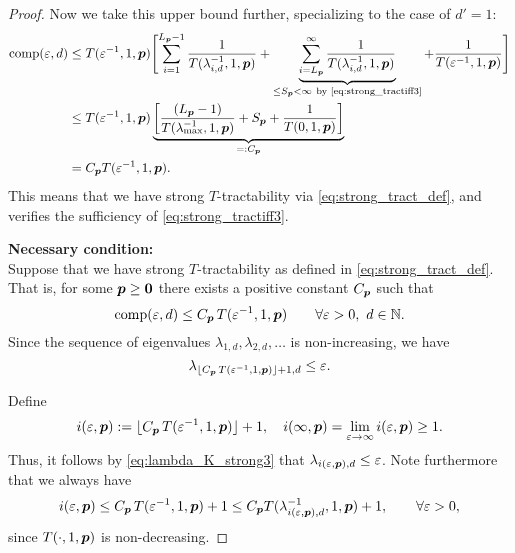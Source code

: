 \documentclass[11pt,a4paper]{article}
\begin{document}
\begin{proof}
Now we take this upper bound further, specializing to the case of $d'=1$:
\begin{align*}
       \operatorname{comp}(\varepsilon,d)
       & \le T(\varepsilon^{-1},1, \boldsymbol{p}) \Biggl [ \sum_{i=1}^{L_{\boldsymbol{p}}-1} \frac{1}{T(\lambda_{i, d}^{-1},1,\boldsymbol{p})}
       + \underbrace{\sum_{i=L_{\boldsymbol{p}}}^\infty \frac{1}{T(\lambda_{i, d}^{-1},1,\boldsymbol{p})}}_{\le S_{\boldsymbol{p}} <\infty\ \text{by \eqref{eq:strong_tractiff3}} }
       + \frac{1}{T(\varepsilon^{-1},1, \boldsymbol{p})} \Biggr] \\
       & \le T(\varepsilon^{-1},1,\boldsymbol{p}) \underbrace{\left[\frac{(L_{\boldsymbol{p}}-1)}{T(\lambda_{\max}^{-1},1,\boldsymbol{p})} + S_{\boldsymbol{p}} + \frac{1}{T(0,1, \boldsymbol{p})}\right]}_{=:C_{\boldsymbol{p}}}\\
       & =  C_{\boldsymbol{p}}T(\varepsilon^{-1},1,\boldsymbol{p}).
\end{align*}
This means that we have strong $T$-tractability via \eqref{eq:strong_tract_def}, and verifies the sufficiency of \eqref{eq:strong_tractiff3}.



\bigskip
\noindent \textbf{Necessary condition:} \\
Suppose that we have strong
$T$-tractability as defined in \eqref{eq:strong_tract_def}. That is, for some $\boldsymbol{p} \ge \boldsymbol{0}$ there exists a positive constant $C_{\boldsymbol{p}}$ such that
\[
\operatorname{comp}(\varepsilon,d)\le C_{\boldsymbol{p}}\, T(\varepsilon^{-1},1,\boldsymbol{p})
\qquad \forall \varepsilon > 0, \ d \in \mathbb{N}.
\]
Since the sequence of eigenvalues $\lambda_{1,d}, \lambda_{2,d}, \ldots $ is non-increasing, we have
\begin{equation}\label{eq:lambda_K_strong3}
\lambda_{\lfloor C_{\boldsymbol{p}}\, T(\varepsilon^{-1},1,\boldsymbol{p})\rfloor +1,d}\le \varepsilon.
\end{equation}

Define
\[
i(\varepsilon,\boldsymbol{p}):= \lfloor C_{\boldsymbol{p}}\, T(\varepsilon^{-1},1,\boldsymbol{p})\rfloor +1, \quad
i(\infty,\boldsymbol{p}) = \lim_{\varepsilon \to \infty}  i(\varepsilon,\boldsymbol{p}) \ge 1 .
\]
Thus, it follows by \eqref{eq:lambda_K_strong3} that $\lambda_{i(\varepsilon,\boldsymbol{p}),d} \le \varepsilon$.
Note furthermore that we always have
\[
i(\varepsilon,\boldsymbol{p})\le C_{\boldsymbol{p}}\, T(\varepsilon^{-1},1,\boldsymbol{p})+1 \le C_{\boldsymbol{p}} T(\lambda_{i(\varepsilon,\boldsymbol{p}),d}^{-1},1,\boldsymbol{p})+1, \qquad \forall \varepsilon > 0,
\]
since
$T(\cdot,1, \boldsymbol{p})$ is non-decreasing.


\end{proof}
\end{document}
